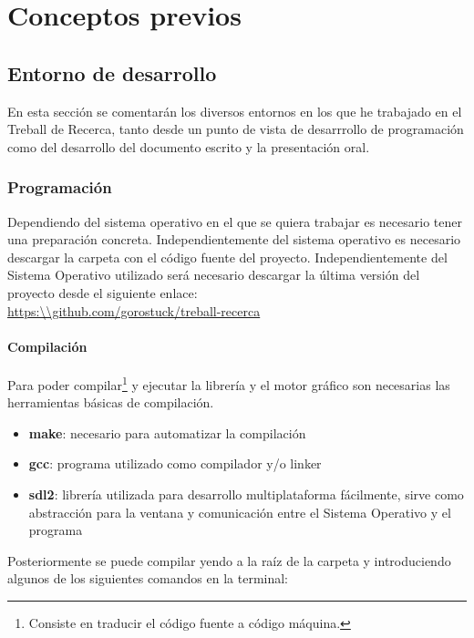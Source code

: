 \chapter{Conceptos previos}
\section{Entorno de desarrollo}
En esta sección se comentarán los diversos entornos en los que he trabajado en el Treball de Recerca, tanto desde un punto de vista de desarrrollo de programación como del desarrollo del documento escrito y la presentación oral.
\subsection{Programación}
Dependiendo del sistema operativo en el que se quiera trabajar es necesario tener una preparación concreta. Independientemente del sistema operativo es necesario descargar la carpeta con el código fuente del proyecto. Independientemente del Sistema Operativo utilizado será necesario descargar la última versión del proyecto desde el siguiente enlace: \\ \url{https:\\github.com/gorostuck/treball-recerca}

\subsubsection{Compilación}
Para poder compilar\footnote{Consiste en traducir el código fuente a código máquina.} y ejecutar la librería y el motor gráfico son necesarias las herramientas básicas de compilación.
\begin{itemize}
\item{\textbf{make}: necesario para automatizar la compilación}
\item{\textbf{gcc}: programa utilizado como compilador y/o linker}
\item{\textbf{sdl2}: librería utilizada para desarrollo multiplataforma fácilmente, sirve como abstracción para la ventana y comunicación entre el Sistema Operativo y el programa}
\end{itemize}

Posteriormente se puede compilar yendo a la raíz de la carpeta y introduciendo algunos de los siguientes comandos en la terminal:

